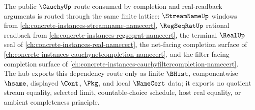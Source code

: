 The public $\CauchyUp$ route consumed by completion and real-readback arguments is routed through the same finite lattice: $\StreamNameUp$ windows from \autoref{ch:concrete-instances-streamname-namecert}, $\RegSeqRatUp$ rational readback from \autoref{ch:concrete-instances-regseqrat-namecert}, the terminal $\RealUp$ seal of \autoref{ch:concrete-instances-real-namecert}, the net-facing completion surface of \autoref{ch:concrete-instances-cauchynetcompletion-namecert}, and the filter-facing completion surface of \autoref{ch:concrete-instances-cauchyfiltercompletion-namecert}. The hub exports this dependency route only as finite $\BHist$, componentwise $\hsame$, displayed $\Cont$, $\Pkg$, and local $\NameCert$ data; it exports no quotient stream equality, selected limit, countable-choice schedule, host real equality, or ambient completeness principle.
